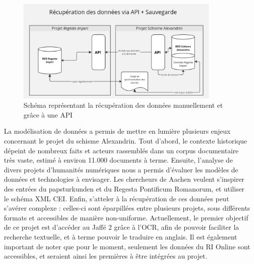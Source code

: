 \begin{figure}[H]
    \centering
    \includegraphics[width=10cm]{images/recup-donnees-api-and-backup.jpg}
    \caption{Schéma représentant la récupération des données manuellement et grâce à une API}
    \label{fig:schemaAPIetbackup}
\end{figure}





La modélisation de données a permis de mettre en lumière plusieurs enjeux concernant le projet du schisme Alexandrin. Tout d’abord, le contexte historique dépeint de nombreux faits et acteurs rassemblés dans un corpus documentaire très vaste, estimé à environ 11.000 documents à terme. Ensuite, l’analyse de divers projets d’humanités numériques nous a permis d’évaluer les modèles de données et technologies à envisager. Les chercheurs de Aachen veulent s’inspirer des entrées du papsturkunden et du Regesta Pontificum Romanorum, et utiliser le schéma XML CEI. Enfin, s’atteler à la récupération de ces données peut s'avérer complexe :  celles-ci sont éparpillées entre plusieurs projets, sous différents formats et accessibles de manière non-uniforme. Actuellement, le premier objectif de ce projet est d’accéder au Jaffé 2 grâce à l’OCR, afin de pouvoir faciliter la recherche textuelle, et à terme pouvoir le traduire en anglais. Il est également important de noter que pour le moment, seulement les données du RI Online sont accessibles, et seraient ainsi les premières à être intégrées au projet.